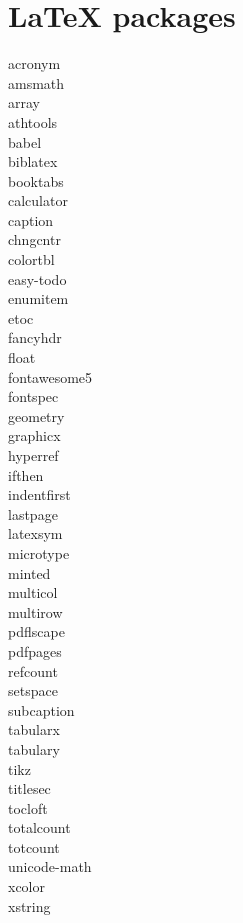 \documentclass [8pt] {extarticle}
\begin{document}
    \section {LaTeX packages}

    acronym \\
    amsmath \\
    array \\
    athtools \\
    babel \\
    biblatex \\
    booktabs \\
    calculator \\
    caption \\
    chngcntr \\
    colortbl \\
    easy-todo \\
    enumitem \\
    etoc \\
    fancyhdr \\
    float \\
    fontawesome5 \\
    fontspec \\
    geometry \\
    graphicx \\
    hyperref \\
    ifthen \\
    indentfirst \\
    lastpage \\
    latexsym \\
    microtype \\
    minted \\
    multicol \\
    multirow \\
    pdflscape \\
    pdfpages \\
    refcount \\
    setspace \\
    subcaption \\
    tabularx \\
    tabulary \\
    tikz \\
    titlesec \\
    tocloft \\
    totalcount \\
    totcount \\
    unicode-math \\
    xcolor \\
    xstring \\
\end{document}
